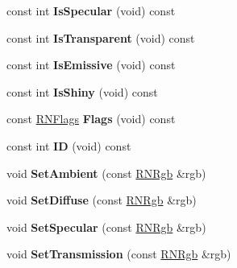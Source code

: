 \begin{DoxyCompactItemize}
\item 
const int {\bfseries Is\+Specular} (void) const \hypertarget{class_r3_brdf_afe58b13d942d0d7b61a7538d44321e2b}{}\label{class_r3_brdf_afe58b13d942d0d7b61a7538d44321e2b}

\item 
const int {\bfseries Is\+Transparent} (void) const \hypertarget{class_r3_brdf_aa40325f67b2353cc792886e48cbbdf97}{}\label{class_r3_brdf_aa40325f67b2353cc792886e48cbbdf97}

\item 
const int {\bfseries Is\+Emissive} (void) const \hypertarget{class_r3_brdf_a9990ddfa6962a8441307f58656c54bb5}{}\label{class_r3_brdf_a9990ddfa6962a8441307f58656c54bb5}

\item 
const int {\bfseries Is\+Shiny} (void) const \hypertarget{class_r3_brdf_ae22e21397896f06042ff5caf280fbfe7}{}\label{class_r3_brdf_ae22e21397896f06042ff5caf280fbfe7}

\item 
const \hyperlink{class_r_n_flags}{R\+N\+Flags} {\bfseries Flags} (void) const \hypertarget{class_r3_brdf_a8cacff926084de6548141ea787b5ae4c}{}\label{class_r3_brdf_a8cacff926084de6548141ea787b5ae4c}

\item 
const int {\bfseries ID} (void) const \hypertarget{class_r3_brdf_a92f445ff7c96aa15946a915024b4f8b8}{}\label{class_r3_brdf_a92f445ff7c96aa15946a915024b4f8b8}

\item 
void {\bfseries Set\+Ambient} (const \hyperlink{class_r_n_rgb}{R\+N\+Rgb} \&rgb)\hypertarget{class_r3_brdf_abd6f043e8ad6dc502f4e704526c997a5}{}\label{class_r3_brdf_abd6f043e8ad6dc502f4e704526c997a5}

\item 
void {\bfseries Set\+Diffuse} (const \hyperlink{class_r_n_rgb}{R\+N\+Rgb} \&rgb)\hypertarget{class_r3_brdf_a85803ca36a81fd52fa07a875b5fe1ba2}{}\label{class_r3_brdf_a85803ca36a81fd52fa07a875b5fe1ba2}

\item 
void {\bfseries Set\+Specular} (const \hyperlink{class_r_n_rgb}{R\+N\+Rgb} \&rgb)\hypertarget{class_r3_brdf_afeef687c49b713d5a2362455a58b8975}{}\label{class_r3_brdf_afeef687c49b713d5a2362455a58b8975}

\item 
void {\bfseries Set\+Transmission} (const \hyperlink{class_r_n_rgb}{R\+N\+Rgb} \&rgb)\hypertarget{class_r3_brdf_a516ba01eb26c02fbc190c4c50851dbe3}{}\label{class_r3_brdf_a516ba01eb26c02fbc190c4c50851dbe3}


\end{DoxyCompactItemize}

